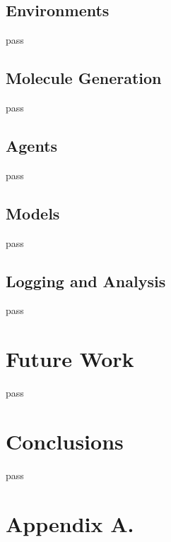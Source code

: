 \documentclass[twoside,11pt]{article}
\begin{document}
\subsection{Environments}
pass

\subsection{Molecule Generation}
pass

\subsection{Agents}
pass

\subsection{Models}
pass

\subsection{Logging and Analysis}
pass
\section{Future Work}
pass
\section{Conclusions}
pass





\vskip 0.2in




\newpage

\appendix
\section*{Appendix A.}
\end{document}
